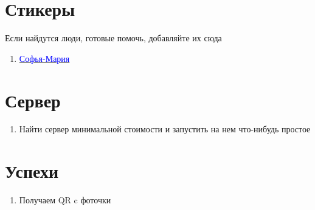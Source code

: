 \documentclass[11pt]{article}
\begin{document}
\section{Стикеры}

Если найдутся люди, готовые помочь,  добавляйте их сюда
\begin{enumerate}

\item \href{https://vk.com/sofiamarid_art}{\textcolor{blue}{Софья-Мария}}

\end{enumerate}
\section{Сервер}

\begin{enumerate}

\item Найти сервер минимальной стоимости и запустить на нем что-нибудь простое 

\end{enumerate}

\section*{Успехи}

\begin{enumerate}
\item Получаем QR c фоточки
\end{enumerate}
 
\end{document}
